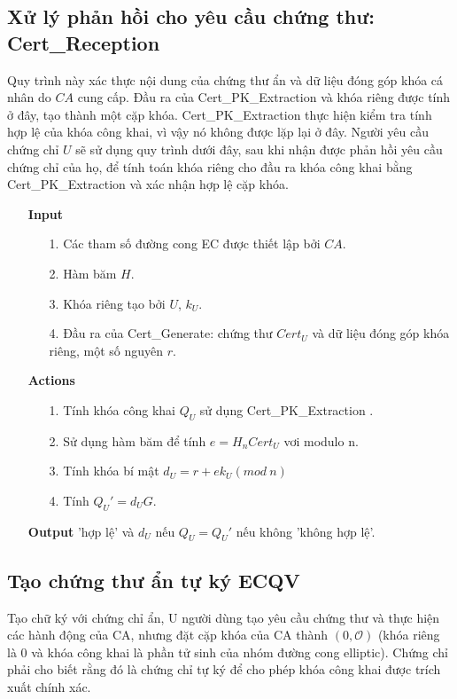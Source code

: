 \documentclass[a4paper,12pt]{report}
\begin{document}
\subsection{Xử lý phản hồi cho yêu cầu chứng thư: Cert\_Reception}
Quy trình này xác thực nội dung của chứng thư ẩn và dữ liệu đóng góp khóa cá nhân do $CA$ cung cấp. Đầu ra của Cert\_PK\_Extraction và khóa riêng được tính ở đây, tạo thành một cặp khóa. Cert\_PK\_Extraction thực hiện kiểm tra tính hợp lệ của khóa công khai, vì vậy nó không được lặp lại ở đây. Người yêu cầu chứng chỉ $U$ sẽ sử dụng quy trình dưới đây, sau khi nhận được phản hồi yêu cầu chứng chỉ của họ, để tính toán khóa riêng cho đầu ra khóa công khai bằng Cert\_PK\_Extraction và xác nhận hợp lệ cặp khóa.
\begin{itemize}
\item[] \textbf{Input}
\begin{itemize}
\item[1. ] Các tham số đường cong EC được thiết lập bởi $CA$.
\item[2. ] Hàm băm $H$.
\item[3. ] Khóa riêng tạo bởi $U$, $k_U$.
\item[4. ] Đầu ra của Cert\_Generate: chứng thư $Cert_U$ và dữ liệu đóng góp khóa riêng, một số nguyên $r$.
\end{itemize}
\item[] \textbf{Actions}
\begin{itemize}
\item[1. ] Tính khóa công khai $Q_U$ sử dụng Cert\_PK\_Extraction .
\item[2. ] Sử dụng hàm băm để tính $e = H_n{Cert_U}$ vơi modulo n.
\item[3. ] Tính khóa bí mật $d_U = r + ek_U (mod \ n)$
\item[4. ] Tính $Q_U' = d_UG$.
\end{itemize}
\item[] \textbf{Output} 'hợp lệ' và $d_U$ nếu $Q_U = Q_U'$ nếu không 'không hợp lệ'.
\end{itemize}
\subsection{Tạo chứng thư ẩn tự ký ECQV}
Tạo chữ ký với chứng chỉ ẩn, U người dùng tạo yêu cầu chứng thư và thực hiện các hành động của CA, nhưng đặt cặp khóa của CA thành $(0, \mathcal{O})$ (khóa riêng là 0 và khóa công khai là phần tử sinh của nhóm đường cong elliptic). Chứng chỉ phải cho biết rằng đó là chứng chỉ tự ký để cho phép khóa công khai được trích xuất chính xác.
\end{document}

